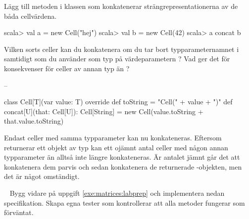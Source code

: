 \Subtask Lägg till metoden  i klassen  som konkatenerar strängrepresentationerna av de båda cellvärdena.

\begin{REPL}
scala> val a = new Cell("hej")
scala> val b = new Cell(42)
scala> a concat b
\end{REPL}

\Subtask Vilken sorts celler kan du konkatenera om du tar bort typparameternamnet  i  samtidigt som du använder  som typ på värdeparametern ? Vad ger det för konsekvenser för celler av annan typ än ?

\SOLUTION

\TaskSolved \what

\SubtaskSolved  --

\SubtaskSolved  \begin{Code}
class Cell[T](var value: T){
	override def toString = "Cell(" + value + ")"
	def concat[U](that: Cell[U]): Cell[String] =
		new Cell(value.toString + that.value.toString)
}
\end{Code}

\SubtaskSolved   Endast celler med samma typparameter kan nu konkateneras. Eftersom  returnerar ett objekt av typ  kan ett ojämnt antal celler med någon annan typparameter än  alltså inte längre konkateneras. Är antalet jämnt går det att konkatenera dem parvis och sedan konkatenera de returnerade -objekten, men det är något omständigt.

\QUESTEND


\QUESTBEGIN

\Task \what~ Bygg vidare på uppgift \ref{exe:matrices:labprep} och implementera nedan specifikation. Skapa egna tester som kontrollerar att alla metoder fungerar som förväntat.

